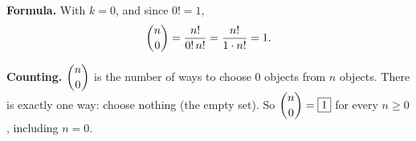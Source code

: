 \textbf{Formula.} With $k=0$, and since $0!=1$,
\[\dbinom n0=\dfrac{n!}{0!\,n!}=\dfrac{n!}{1\cdot n!}=1.\]

\textbf{Counting.} $\dbinom n0$ is the number of ways to choose $0$ objects from $n$ objects. There is exactly one way: choose nothing (the empty set). So $\dbinom n0=\boxed{1}$ for every $n\ge0$, including $n=0$.
